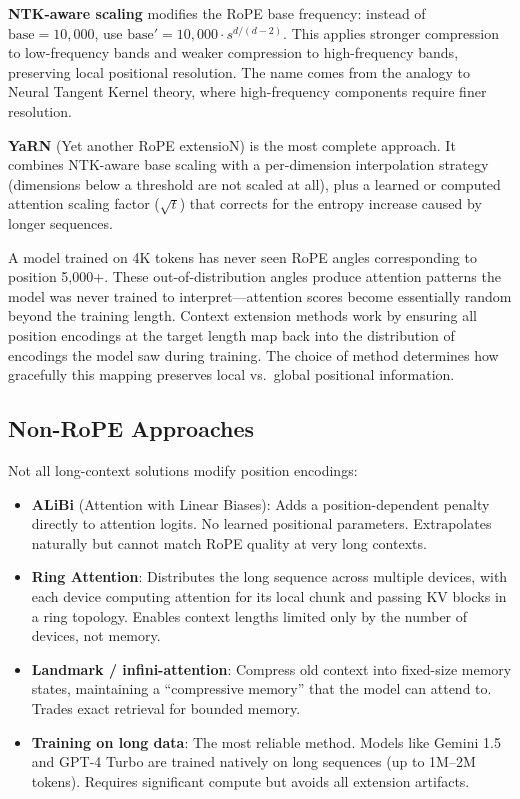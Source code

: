 \textbf{NTK-aware scaling} modifies the RoPE base frequency: instead of $\text{base} = 10{,}000$, use $\text{base}' = 10{,}000 \cdot s^{d/(d-2)}$. This applies stronger compression to low-frequency bands and weaker compression to high-frequency bands, preserving local positional resolution. The name comes from the analogy to Neural Tangent Kernel theory, where high-frequency components require finer resolution.

\textbf{YaRN} (Yet another RoPE extensioN) is the most complete approach. It combines NTK-aware base scaling with a per-dimension interpolation strategy (dimensions below a threshold are not scaled at all), plus a learned or computed attention scaling factor ($\sqrt{t}$) that corrects for the entropy increase caused by longer sequences.

\begin{keyinsight}
A model trained on 4K tokens has never seen RoPE angles corresponding to position 5,000+. These out-of-distribution angles produce attention patterns the model was never trained to interpret---attention scores become essentially random beyond the training length. Context extension methods work by ensuring all position encodings at the target length map back into the distribution of encodings the model saw during training. The choice of method determines how gracefully this mapping preserves local vs.\ global positional information.
\end{keyinsight}

\subsection{Non-RoPE Approaches}

Not all long-context solutions modify position encodings:

\begin{itemize}
    \item \textbf{ALiBi} (Attention with Linear Biases): Adds a position-dependent penalty directly to attention logits. No learned positional parameters. Extrapolates naturally but cannot match RoPE quality at very long contexts.
    \item \textbf{Ring Attention}: Distributes the long sequence across multiple devices, with each device computing attention for its local chunk and passing KV blocks in a ring topology. Enables context lengths limited only by the number of devices, not memory.
    \item \textbf{Landmark / infini-attention}: Compress old context into fixed-size memory states, maintaining a ``compressive memory'' that the model can attend to. Trades exact retrieval for bounded memory.
    \item \textbf{Training on long data}: The most reliable method. Models like Gemini 1.5 and GPT-4 Turbo are trained natively on long sequences (up to 1M--2M tokens). Requires significant compute but avoids all extension artifacts.
\end{itemize}


